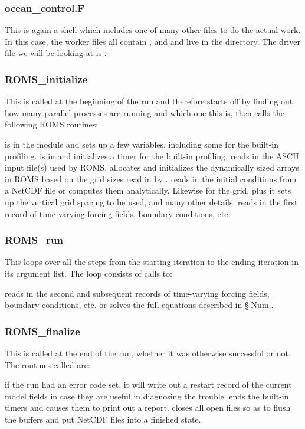 \subsubsection{ocean\_control.F}
This is again a shell which includes one of many other files to do
the actual work. In this case, the worker files all contain
,  and 
and live in the  directory. The driver file we
will be looking at is .

\subsubsection{ROMS\_initialize}
This is called at the beginning of the run and therefore starts off
by finding out how many parallel processes are running and which one
this is, then calls the following ROMS routines:
\begin{klist}
   is in the  module and
  sets up a few variables, including some for the built-in profiling.
   is in  and initializes a timer for
  the built-in profiling.
   reads in the ASCII input file(s) used by ROMS.
   allocates and initializes the dynamically sized
  arrays in ROMS based on the grid sizes read in by .
   reads in the initial conditions from a NetCDF file or
  computes them analytically. Likewise for the grid, plus it sets up the
  vertical grid spacing to be used, and many other details.
   reads in the first record of time-varying forcing
  fields, boundary conditions, etc.
\end{klist}

\subsubsection{ROMS\_run}
This loops over all the steps from the starting iteration to the ending
iteration in its argument list. The loop consists of calls to:
\begin{klist}
   reads in the second and subsequent records of
  time-varying forcing fields, boundary conditions, etc.
   or  solves the full
  equations described in \S\ref{Num}.
\end{klist}

\subsubsection{ROMS\_finalize}
This is called at the end of the run, whether it was otherwise
successful or not. The routines called are:
\begin{klist}
   if the run had an error code set, it will write out a
  restart record of the current model fields in case they are useful in
  diagnosing the trouble.
   ends the built-in timers and causes them to print
  out a report.
   closes all open files so as to flush the buffers
  and put NetCDF files into a finished state.
\end{klist}

